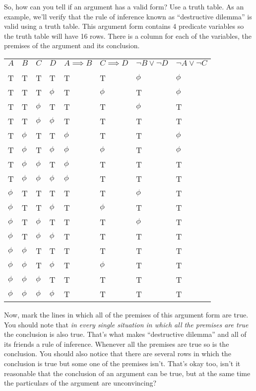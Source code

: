 \documentclass[10pt,]{book}
\theoremstyle{plain}
\theoremstyle{definition}
\theoremstyle{definition}
\numberwithin{equation}{section}
\newcommand{\hrulethin}  {\noalign{\hrule height 0.04em}}
\begin{document}
    So, how can you tell if an argument has a valid form? Use a truth table.
    As an example, we'll verify that the rule of inference known as
    ``destructive dilemma''
    is valid using a truth table. This argument
    form contains 4 predicate variables so the truth table will have 16 rows.
    There is a column for each of the variables, the premises of the argument
    and its conclusion.
\begin{tabular}{llllllll}
\(A\)&\(B\)&\(C\)&\(D\)&\(A{\implies}B\)&\(C{\implies}D\)&\({\lnot}B \lor {\lnot}D\)&\({\lnot}A \lor {\lnot}C\)\tabularnewline[0pt]
&&&&&&&\tabularnewline\hrulethin
T&T&T&T&T&T&\(\phi\)&\(\phi\)\tabularnewline[0pt]
T&T&T&\(\phi\)&T&\(\phi\)&T&\(\phi\)\tabularnewline[0pt]
T&T&\(\phi\)&T&T&T&\(\phi\)&T\tabularnewline[0pt]
T&T&\(\phi\)&\(\phi\)&T&T&T&T\tabularnewline[0pt]
T&\(\phi\)&T&T&\(\phi\)&T&T&\(\phi\)\tabularnewline[0pt]
T&\(\phi\)&T&\(\phi\)&\(\phi\)&\(\phi\)&T&\(\phi\)\tabularnewline[0pt]
T&\(\phi\)&\(\phi\)&T&\(\phi\)&T&T&T\tabularnewline[0pt]
T&\(\phi\)&\(\phi\)&\(\phi\)&\(\phi\)&T&T&T\tabularnewline[0pt]
\(\phi\)&T&T&T&T&T&\(\phi\)&T\tabularnewline[0pt]
\(\phi\)&T&T&\(\phi\)&T&\(\phi\)&T&T\tabularnewline[0pt]
\(\phi\)&T&\(\phi\)&T&T&T&\(\phi\)&T\tabularnewline[0pt]
\(\phi\)&T&\(\phi\)&\(\phi\)&T&T&T&T\tabularnewline[0pt]
\(\phi\)&\(\phi\)&T&T&T&T&T&T\tabularnewline[0pt]
\(\phi\)&\(\phi\)&T&\(\phi\)&T&\(\phi\)&T&T\tabularnewline[0pt]
\(\phi\)&\(\phi\)&\(\phi\)&T&T&T&T&T\tabularnewline[0pt]
\(\phi\)&\(\phi\)&\(\phi\)&\(\phi\)&T&T&T&T
\end{tabular}
\par

    Now, mark the lines in which all of the premises of this argument form
    are true. You should note that \emph{in every single situation in which
    all the premises are true} the conclusion is also true. That's what
    makes ``destructive dilemma'' \textemdash{} and all of its friends \textemdash{} a rule of
    inference. Whenever all the premises are true so is the conclusion.
    You should also notice that there are several rows in which the
    conclusion is true but some one of the premises isn't. That's
    okay too, isn't it reasonable that the conclusion of an argument
    can be true, but at the same time the particulars of the argument
    are unconvincing?
\par
\end{document}
